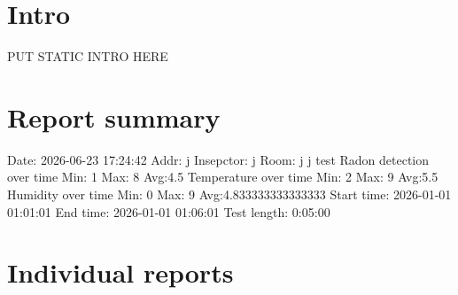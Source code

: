 \documentclass{article}%
\begin{document}
%
\normalsize%
\section{Intro}%
\label{sec:Intro}%
PUT STATIC INTRO HERE%

\section{Report summary}%
\label{sec:Summary}%
Date: 2026-06-23 17:24:42\newline
Addr: j\newline
Insepctor: j\newline
Room: j\newline
j test\newline
Radon detection over time\newline
Min: 1\newline
Max: 8\newline
Avg:4.5\newline
Temperature over time\newline
Min: 2\newline
Max: 9\newline
Avg:5.5\newline
Humidity over time\newline
Min: 0\newline
Max: 9\newline
Avg:4.833333333333333\newline
\newline
Start time: 2026-01-01 01:01:01\newline
End time: 2026-01-01 01:06:01\newline
Test length: 0:05:00\newline
%

\section{Individual reports}%
\label{sec:Reports}%

\newline%

\newline%


%
\end{document}
